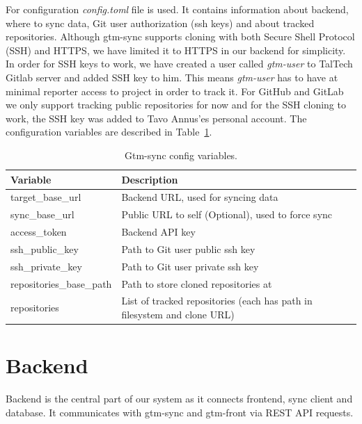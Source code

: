 For configuration \textit{config.toml} file is used.
It contains information about backend, where to sync data, Git user authorization (ssh keys) and about tracked repositories.
Although gtm-sync supports cloning with both Secure Shell Protocol (SSH) and HTTPS, we have limited it to HTTPS in our backend for simplicity.
In order for SSH keys to work, we have created a user called \textit{gtm-user} to TalTech Gitlab server and added SSH key to him.
This means \textit{gtm-user} has to have at minimal reporter access to project in order to track it.
For GitHub and GitLab we only support tracking public repositories for now and for the SSH cloning to work, the SSH key was added to
Tavo Annus'es personal account.
The configuration variables are described in Table~\ref{tab:gtm-sync-config}.

\begin{table}[H]
    \centering
    \begin{tabular}{ | p{6cm} | p{6cm} |}
        \hline
        \textbf{Variable} & \textbf{Description}\\
        \hline
        target\_base\_url & Backend URL, used for syncing data \\
        \hline
        sync\_base\_url &  Public URL to self (Optional), used to force sync\\
        \hline
        access\_token & Backend API key\\
        \hline
        ssh\_public\_key & Path to Git user public ssh key\\
        \hline
        ssh\_private\_key & Path to Git user private ssh key\\
        \hline
        repositories\_base\_path & Path to store cloned repositories at\\
        \hline
        repositories & List of tracked repositories (each has path in filesystem and clone URL)\\
        \hline
    \end{tabular}
    \caption{Gtm-sync config variables.}
    \label{tab:gtm-sync-config}
\end{table}

\section{Backend}\label{sec:backend-content}
Backend is the central part of our system as it connects frontend, sync client and database.
It communicates with gtm-sync and gtm-front via REST API requests.

